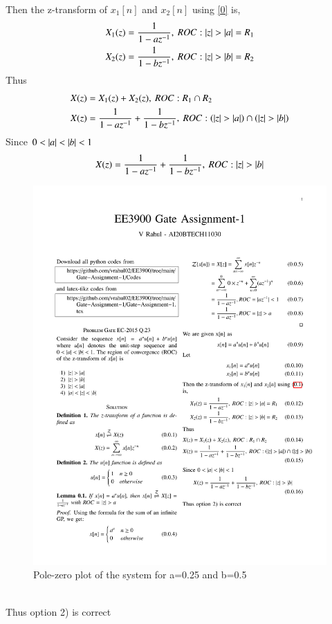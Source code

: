 \documentclass[journal,12pt,twocolumn]{IEEEtran}
\begin{document}
Then the z-transform of $x_1[n]$ and $x_2[n]$ using \eqref{0} is,
\begin{align}
    X_1(z)&=\frac{1}{1-az^{-1}}, \:ROC: \vert z\vert>\vert a\vert=R_1\\
    X_2(z)&=\frac{1}{1-bz^{-1}}, \:ROC: \vert z\vert>\vert b\vert=R_2
\end{align}
Thus
\begin{align}
    X(z)&=X_1(z)+X_2(z), \:ROC: R_1\cap R_2\\
    X(z)&=\frac{1}{1-az^{-1}}+\frac{1}{1-bz^{-1}}, \:ROC: \left(\vert z\vert>\vert a\vert\right)\cap\left(\vert z\vert>\vert b\vert\right)
\end{align}
Since $0< \vert a\vert< \vert b\vert < 1$
\begin{align}
    X(z)=\frac{1}{1-az^{-1}}+\frac{1}{1-bz^{-1}}, \:ROC: \vert z\vert>\vert b\vert
\end{align}
\begin{figure}[!ht]
    \centering
    \includegraphics[width=\columnwidth]{Gate Assignment-1}
    \caption{Pole-zero plot of the system for a=0.25 and b=0.5}
    \label{a}
\end{figure}\\
Thus option 2) is correct
\end{document}
